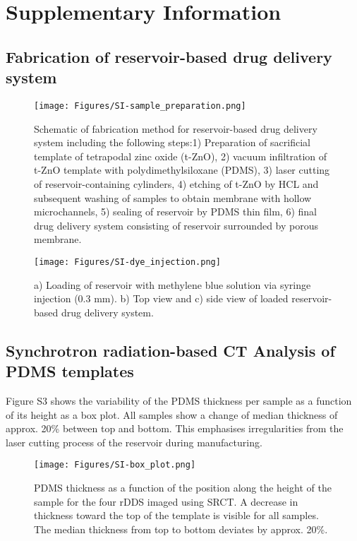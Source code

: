 \documentclass{article}
\begin{document}
  \section*{Supplementary Information}
  \subsection*{Fabrication of reservoir-based drug delivery system}

  \begin{figure}[h!]
    \centering
    \texttt{[image: Figures/SI-sample\_preparation.png]}
    \caption{Schematic of fabrication method for reservoir-based drug delivery system including the following steps:1) Preparation of sacrificial template of tetrapodal zinc oxide (t-ZnO), 2) vacuum infiltration of t-ZnO template with polydimethylsiloxane (PDMS), 3) laser cutting of reservoir-containing cylinders, 4) etching of t-ZnO by HCL and subsequent washing of samples to obtain membrane with hollow microchannels, 5) sealing of reservoir by PDMS thin film, 6) final drug delivery system consisting of reservoir surrounded by porous membrane.}
  \end{figure}

  \newpage

  \begin{figure}[h!]
    \centering
    \texttt{[image: Figures/SI-dye\_injection.png]}
    \caption{a) Loading of reservoir with methylene blue solution via syringe injection (0.3 mm). b) Top view  and c) side view of loaded reservoir-based drug delivery system.}
  \end{figure}

  \newpage
  \subsection*{Synchrotron radiation-based \textmu CT Analysis of PDMS templates}

  Figure S3 shows the variability of the PDMS thickness per sample as a function of its height as a box plot. All samples show a change of median thickness of approx. 20\% between top and bottom. This emphasises irregularities from the laser cutting process of the reservoir during manufacturing.

  \begin{figure}[h!]
    \texttt{[image: Figures/SI-box\_plot.png]}
    \caption{PDMS thickness as a function of the position along the height of the sample for the four rDDS imaged using SR\textmu CT. A decrease in thickness toward the top of the template is visible for all samples. The median thickness from top to bottom deviates by approx. 20\%.}
  \end{figure}
\end{document}
